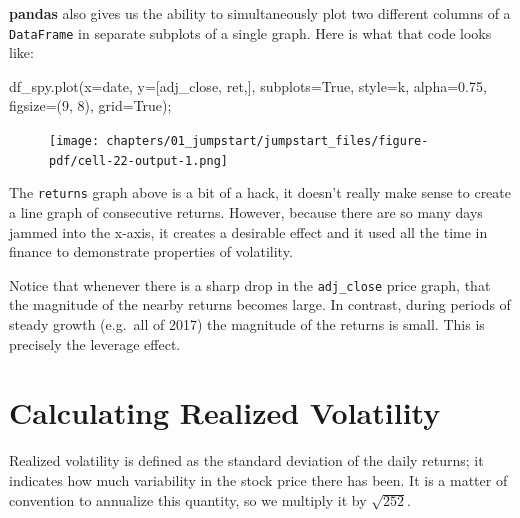\documentclass[
  letterpaper,
  DIV=11,
  numbers=noendperiod]{scrreprt}
\newenvironment{Shaded}{\begin{snugshade}}{\end{snugshade}}
\newcommand{\DecValTok}[1]{\textcolor[rgb]{0.68,0.00,0.00}{#1}}
\newcommand{\FloatTok}[1]{\textcolor[rgb]{0.68,0.00,0.00}{#1}}
\newcommand{\NormalTok}[1]{\textcolor[rgb]{0.00,0.23,0.31}{#1}}
\newcommand{\OperatorTok}[1]{\textcolor[rgb]{0.37,0.37,0.37}{#1}}
\newcommand{\StringTok}[1]{\textcolor[rgb]{0.13,0.47,0.30}{#1}}
\newcommand{\VariableTok}[1]{\textcolor[rgb]{0.07,0.07,0.07}{#1}}
\begin{document}
\textbf{pandas} also gives us the ability to simultaneously plot two
different columns of a \texttt{DataFrame} in separate subplots of a
single graph. Here is what that code looks like:

\begin{Shaded}
\begin{Highlighting}[]
\NormalTok{df\_spy.plot(x}\OperatorTok{=}\StringTok{\textquotesingle{}date\textquotesingle{}}\NormalTok{, y}\OperatorTok{=}\NormalTok{[}\StringTok{\textquotesingle{}adj\_close\textquotesingle{}}\NormalTok{, }\StringTok{\textquotesingle{}ret\textquotesingle{}}\NormalTok{,], subplots}\OperatorTok{=}\VariableTok{True}\NormalTok{, style}\OperatorTok{=}\StringTok{\textquotesingle{}k\textquotesingle{}}\NormalTok{, alpha}\OperatorTok{=}\FloatTok{0.75}\NormalTok{, figsize}\OperatorTok{=}\NormalTok{(}\DecValTok{9}\NormalTok{, }\DecValTok{8}\NormalTok{), grid}\OperatorTok{=}\VariableTok{True}\NormalTok{)}\OperatorTok{;}
\end{Highlighting}
\end{Shaded}

\begin{figure}[H]

{\centering \texttt{[image: chapters/01\_jumpstart/jumpstart\_files/figure-pdf/cell-22-output-1.png]}

}

\end{figure}

The \texttt{returns} graph above is a bit of a hack, it doesn't really
make sense to create a line graph of consecutive returns. However,
because there are so many days jammed into the x-axis, it creates a
desirable effect and it used all the time in finance to demonstrate
properties of volatility.

Notice that whenever there is a sharp drop in the \texttt{adj\_close}
price graph, that the magnitude of the nearby returns becomes large. In
contrast, during periods of steady growth (e.g.~all of 2017) the
magnitude of the returns is small. This is precisely the leverage
effect.

\hypertarget{calculating-realized-volatility}{%
\section{Calculating Realized
Volatility}\label{calculating-realized-volatility}}

Realized volatility is defined as the standard deviation of the daily
returns; it indicates how much variability in the stock price there has
been. It is a matter of convention to annualize this quantity, so we
multiply it by \(\sqrt{252}\).
\end{document}
